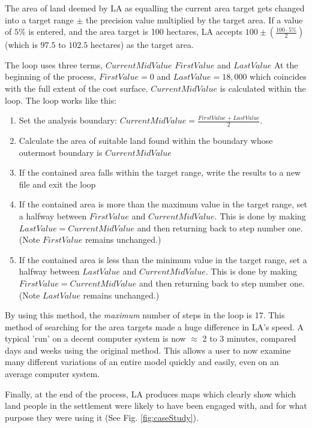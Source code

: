   The area of land deemed by LA as equalling the current area target gets
  changed into a target range $\pm$ the precision value multiplied by the 
  target area. If a value of $5\%$ is entered, and the area target is 100
  hectares, LA accepts $100 \pm(\frac{100 \cdot 5\%}{2})$ (which is $97.5$
  to $102.5$ hectares) as the target area.  
  
  The loop uses three terms, $CurrentMidValue$ $FirstValue$ and $LastValue$ At
  the beginning of the process, $FirstValue=0$ and $LastValue=18,000$ which
  coincides with the full extent of the cost surface.  $CurrentMidValue$ is 
  calculated within the loop.  The loop works like this:

  \begin{enumerate} 
    \item Set the analysis boundary: $CurrentMidValue=\frac{FirstValue +
      LastValue}{2}$.  
    \item Calculate the area of suitable land found within the boundary whose
      outermost boundary is $CurrentMidValue$ 
    \item If the contained area falls within the target range, write the results
      to a new file and exit the loop 
    \item If the contained area is more than the maximum value in the target
      range, set a halfway between $FirstValue$ and $CurrentMidValue$. This is
      done by making $LastValue=CurrentMidValue$ and then returning back to step
      number
      one.  (Note $FirstValue$ remains unchanged.) 
    \item If the contained area is less than the minimum value in the target
      range, set a halfway between $LastValue$ and $CurrentMidValue$. This is
      done by making $FirstValue=CurrentMidValue$ and then returning back to step
      number one.  (Note $LastValue$ remains unchanged.) 
  \end{enumerate}

  By using this method, the \textit{maximum} number of steps in the loop is 17.
  This method of searching for the area targets made a huge difference in LA's
  speed.  A typical 'run' on a decent computer system is now $\approx$ 2 to 3
  minutes, compared days and weeks using the original method.  This allows a
  user to now examine many different variations of an entire model quickly and
  easily, even on an average computer system.
  
  Finally, at the end of the process, LA produces maps which clearly show
  which land people in the settlement were likely to have been engaged with, and
  for what purpose they were using it (See Fig. \ref{fig:caseStudy}).
 
